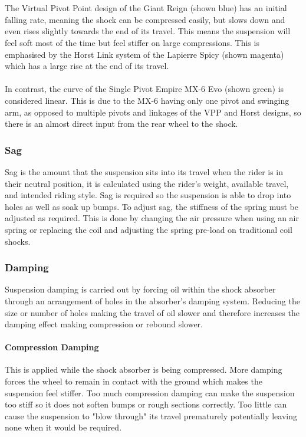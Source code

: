 \documentclass[a4paper, 12pt, hidelinks]{article}
\begin{document}
		\\\\
		The Virtual Pivot Point design of the Giant Reign (shown blue) has an initial falling rate, meaning the shock can be compressed easily, but slows down and even rises slightly towards the end of its travel. This means the suspension will feel soft most of the time but feel stiffer on large compressions. This is emphasised by the Horst Link system of the Lapierre Spicy (shown magenta) which has a large rise at the end of its travel.
		\\\\
		In contrast, the curve of the Single Pivot Empire MX-6 Evo (shown green) is considered linear. This is due to the MX-6 having only one pivot and swinging arm, as opposed to multiple pivots and linkages of the VPP and Horst designs, so there is an almost direct input from the rear wheel to the shock.
	\subsubsection{Sag}
		Sag is the amount that the suspension sits into its travel when the rider is in their neutral position, it is calculated using the rider's weight, available travel, and intended riding style. Sag is required so the suspension is able to drop into holes as well as soak up bumps. To adjust sag, the stiffness of the spring must be adjusted as required. This is done by changing the air pressure when using an air spring or replacing the coil and adjusting the spring pre-load on traditional coil shocks.
	\subsubsection{Damping}
		Suspension damping is carried out by forcing oil within the shock absorber through an arrangement of holes in the absorber's damping system. Reducing the size or number of holes making the travel of oil slower and therefore increases the damping effect making compression or rebound slower.
	\paragraph{Compression Damping} 
		This is applied while the shock absorber is being compressed. More damping forces the wheel to remain in contact with the ground which makes the suspension feel stiffer. Too much compression damping can make the suspension too stiff so it does not soften bumps or rough sections correctly. Too little can cause the suspension to "blow through" its travel prematurely potentially leaving none when it would be required.
\end{document}
